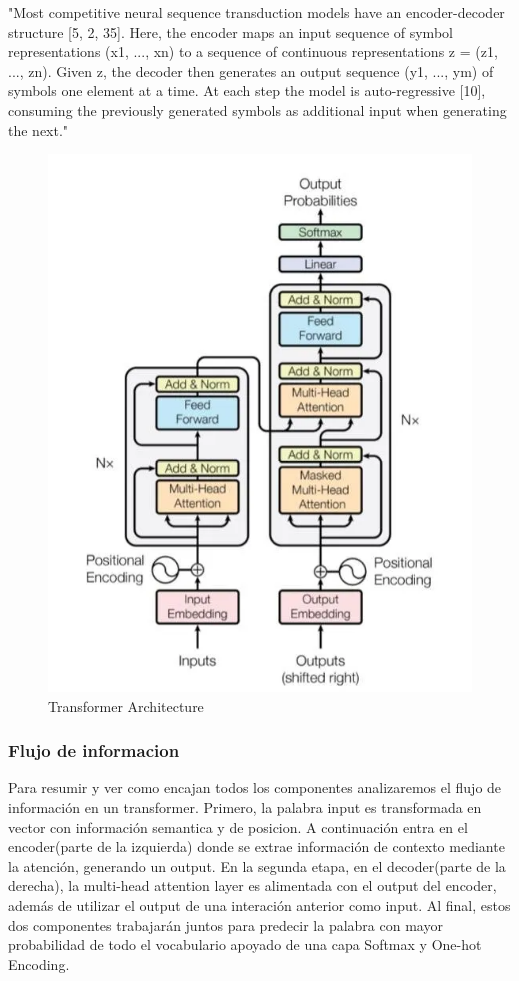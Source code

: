 "Most competitive neural sequence transduction models have an encoder-decoder structure [5, 2, 35].
Here, the encoder maps an input sequence of symbol representations (x1, ..., xn) to a sequence
of continuous representations z = (z1, ..., zn). Given z, the decoder then generates an output
sequence (y1, ..., ym) of symbols one element at a time. At each step the model is auto-regressive
[10], consuming the previously generated symbols as additional input when generating the next."
    \begin{figure}[H]
            \centering
            \includegraphics[width=.6\textwidth]{plantilla-libro/img/transformer_architecture.png}
            \caption{Transformer Architecture}
            \label{fig:transformer}
        \end{figure}
    \subsubsection{Flujo de informacion}
    Para resumir y ver como encajan todos los componentes analizaremos el flujo de información en un transformer. 
    Primero, la palabra input es transformada en vector con información semantica y de posicion. A continuación entra en el encoder(parte de la izquierda) donde se extrae información de contexto mediante la atención, generando un output.
    En la segunda etapa, en el decoder(parte de la derecha), la multi-head attention layer es alimentada con el output del encoder, además de utilizar el output de una interación anterior como input. 
    Al final, estos dos componentes trabajarán juntos para predecir la palabra con mayor probabilidad de todo el vocabulario apoyado de una capa Softmax y One-hot Encoding.
